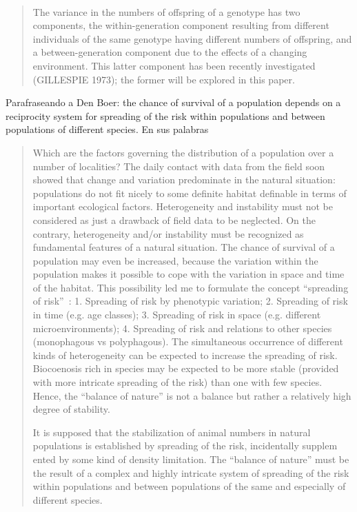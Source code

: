 \documentclass[a4paper,10pt]{article}
\begin{document}
\\

\begin{quotation} \cite{gillespie1974-variance}
    The variance in the numbers of offspring of a genotype has two components, the within-generation component resulting from different individuals of the same genotype having different numbers of offspring, and a between-generation component due to the effects of a changing environment.
    This latter component has been recently investigated (GILLESPIE 1973); the former will be explored in this paper.
\end{quotation}


Parafraseando a Den Boer: the chance of survival of a population depends on a reciprocity system for spreading of the risk within populations and between populations of different species.
En sus palabras
\begin{quotation}
    Which are the factors governing the distribution of a population over a number of localities?
    The daily contact with data from the field soon showed that change and variation predominate in the natural situation: populations do not fit
    nicely to some definite habitat definable in terms of important ecological factors.
    Heterogeneity and instability must not be considered as just a drawback of field data to be neglected.
    On the contrary, heterogeneity and/or instability must be recognized as fundamental features of a natural situation.
    The chance of survival of a population may even be increased, because the variation within the population makes it possible to cope with the variation in space and time of the habitat.
    This possibility led me to formulate the concept ``spreading of risk''~\cite{denBoer1968-spreadingRisk}: 1. Spreading of risk by phenotypic variation; 2. Spreading of risk in time (e.g. age classes); 3. Spreading of risk in space (e.g. different microenvironments); 4. Spreading of risk and relations to other species (monophagous vs polyphagous).
    The simultaneous occurrence of different kinds of heterogeneity can be expected to increase the spreading of risk.
    Biocoenosis rich in species may be expected to be more stable (provided with more intricate spreading of the risk) than one with few species.
    Hence, the ``balance of nature'' is not a balance but rather a relatively high degree of stability.

    It is supposed that the stabilization of animal numbers in natural populations is established by spreading of the risk, incidentally supplem ented by some kind of density limitation.
    The ``balance of nature'' must be the result of a complex and highly intricate system of spreading of the risk within populations and between populations of the same and especially of different species.
\end{quotation}
\end{document}
